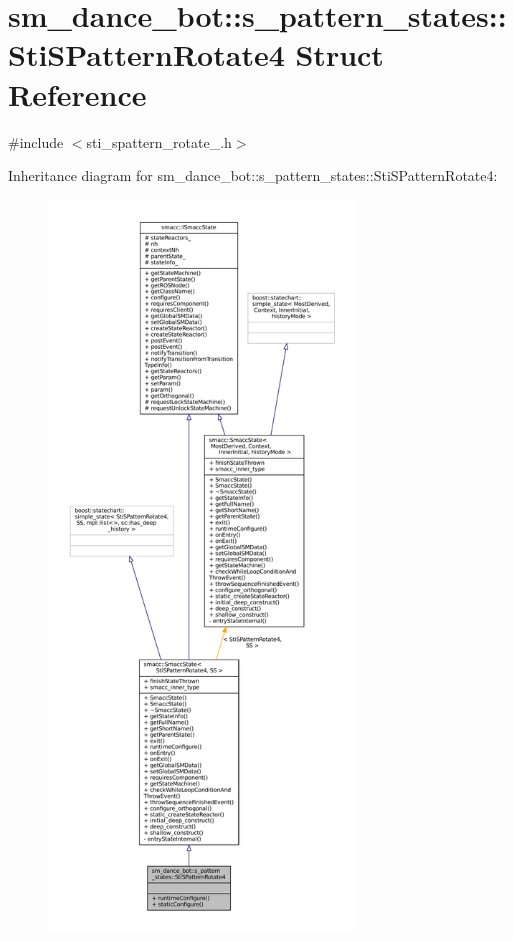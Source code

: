 \hypertarget{structsm__dance__bot_1_1s__pattern__states_1_1StiSPatternRotate4}{}\section{sm\+\_\+dance\+\_\+bot\+:\+:s\+\_\+pattern\+\_\+states\+:\+:Sti\+S\+Pattern\+Rotate4 Struct Reference}
\label{structsm__dance__bot_1_1s__pattern__states_1_1StiSPatternRotate4}


{\ttfamily \#include $<$sti\+\_\+spattern\+\_\+rotate\+\_.\+h$>$}



Inheritance diagram for sm\+\_\+dance\+\_\+bot\+:\+:s\+\_\+pattern\+\_\+states\+:\+:Sti\+S\+Pattern\+Rotate4\+:
\nopagebreak
\begin{figure}[H]
\begin{center}
\leavevmode
\includegraphics[height=550pt]{structsm__dance__bot_1_1s__pattern__states_1_1StiSPatternRotate4__inherit__graph}
\end{center}
\end{figure}


